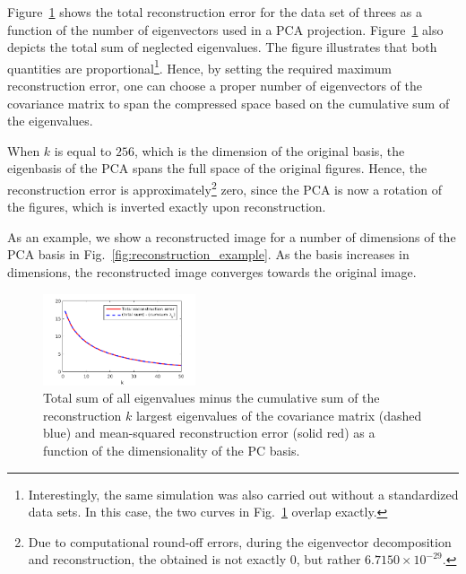 \documentclass[pdftex,11pt,a4paper]{article}
\begin{document}
Figure~\ref{fig:recon_and_cumsum} shows the total reconstruction error for the data set of threes as a function of the number of eigenvectors used in a PCA projection. Figure~\ref{fig:recon_and_cumsum} also depicts the total sum of neglected eigenvalues. The figure illustrates that both quantities are proportional\footnote{Interestingly, the same simulation was also carried out without a standardized data sets. In this case, the two curves in Fig.~\ref{fig:recon_and_cumsum} overlap exactly.}. Hence, by setting the required maximum reconstruction error, one can choose a proper number of eigenvectors of the covariance matrix to span the compressed space based on the cumulative sum of the eigenvalues.

When $k$ is equal to $256$, which is the dimension of the original basis, the eigenbasis of the PCA spans the full space of the original figures. Hence, the reconstruction error is approximately\footnote{Due to computational round-off errors, during the eigenvector decomposition and reconstruction, the obtained is not exactly $0$, but rather $6.7150 \times 10^{-29}$.} zero, since the PCA is now a rotation of the figures, which is inverted exactly upon reconstruction.

As an example, we show a reconstructed image for a number of dimensions of the PCA basis in Fig.~\ref{fig:reconstruction_example}. As the basis increases in dimensions, the reconstructed image converges towards the original image.

\begin{figure}[htb]
\centering
\includegraphics[width=0.4\textwidth]{figs/recon_and_cumsum.png}
\caption{Total sum of all eigenvalues minus the cumulative sum of the reconstruction $k$ largest eigenvalues of the covariance matrix (dashed blue) and mean-squared reconstruction error (solid red) as a function of the dimensionality of the PC basis.\label{fig:recon_and_cumsum}}
\end{figure}

\end{document}
